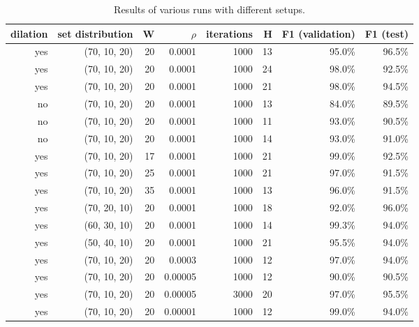 \documentclass[report.tex]{subfile}
\begin{document}
\begin{table}[h]
    \centering
    \begin{tabular}{rrrrr|rrr}
        dilation & set distribution & W & $\rho$ & iterations &
        H & F1 (validation) & F1 (test) \\\hline

        yes & (70, 10, 20) & 20 & 0.0001  & 1000 & 13 & 95.0\% & 96.5\% \\
        yes & (70, 10, 20) & 20 & 0.0001  & 1000 & 24 & 98.0\% & 92.5\% \\
        yes & (70, 10, 20) & 20 & 0.0001  & 1000 & 21 & 98.0\% & 94.5\% \\
        no  & (70, 10, 20) & 20 & 0.0001  & 1000 & 13 & 84.0\% & 89.5\% \\
        no  & (70, 10, 20) & 20 & 0.0001  & 1000 & 11 & 93.0\% & 90.5\% \\
        no  & (70, 10, 20) & 20 & 0.0001  & 1000 & 14 & 93.0\% & 91.0\% \\
        yes & (70, 10, 20) & 17 & 0.0001  & 1000 & 21 & 99.0\% & 92.5\% \\
        yes & (70, 10, 20) & 25 & 0.0001  & 1000 & 21 & 97.0\% & 91.5\% \\
        yes & (70, 10, 20) & 35 & 0.0001  & 1000 & 13 & 96.0\% & 91.5\% \\
        yes & (70, 20, 10) & 20 & 0.0001  & 1000 & 18 & 92.0\% & 96.0\% \\
        yes & (60, 30, 10) & 20 & 0.0001  & 1000 & 14 & 99.3\% & 94.0\% \\
        yes & (50, 40, 10) & 20 & 0.0001  & 1000 & 21 & 95.5\% & 94.0\% \\
        yes & (70, 10, 20) & 20 & 0.0003  & 1000 & 12 & 97.0\% & 94.0\% \\
        yes & (70, 10, 20) & 20 & 0.00005 & 1000 & 12 & 90.0\% & 90.5\% \\
        yes & (70, 10, 20) & 20 & 0.00005 & 3000 & 20 & 97.0\% & 95.5\% \\
        yes & (70, 10, 20) & 20 & 0.00001 & 1000 & 12 & 99.0\% & 94.0\% \\
    \end{tabular}
    \caption{Results of various runs with different setups.}
    \label{fig:runs}
\end{table}
\end{document}
